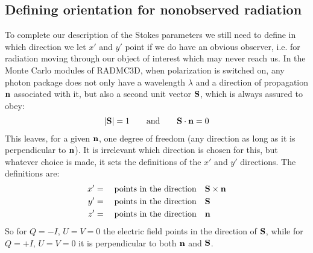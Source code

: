 \documentclass[letterpaper,10pt,english]{sphinxmanual}
\begin{document}
\subsection{Defining orientation for non\sphinxhyphen{}observed radiation}
\label{\detokenize{dustradtrans:defining-orientation-for-non-observed-radiation}}\label{\detokenize{dustradtrans:sec-orientation-vector-stokes}}
To complete our description of the Stokes parameters we still need to define in
which direction we let \(x'\) and \(y'\) point if we do  have an
obvious observer, i.e. for radiation moving through our object of interest which
may never reach us. In the Monte Carlo modules of RADMC\sphinxhyphen{}3D, when polarization is
switched on, any photon package does not only have a wavelength \(\lambda\)
and a direction of propagation \({\bf n}\) associated with it, but also a
second unit vector \({\bf S}\), which is always assured to obey:
\begin{equation*}
\begin{split}|{\bf S}| = 1 \qquad \hbox{and} \qquad {\bf S}\cdot{\bf n}=0\end{split}
\end{equation*}
This leaves, for a given \({\bf n}\), one degree of freedom (any direction
as long as it is perpendicular to \({\bf n}\)). It is irrelevant which
direction is chosen for this, but whatever choice is made, it sets the
definitions of the \(x'\) and \(y'\) directions. The definitions are:
\begin{equation*}
\begin{split}\begin{split}
x' &= \quad\hbox{points in the direction}\quad {\bf S}\times {\bf n}\\
y' &= \quad\hbox{points in the direction}\quad {\bf S}\\
z' &= \quad\hbox{points in the direction}\quad {\bf n}
\end{split}\end{split}
\end{equation*}
So for \(Q=-I\), \(U=V=0\) the electric field points in the direction of
\({\bf S}\), while for \(Q=+I\), \(U=V=0\) it is perpendicular to
both \({\bf n}\) and \({\bf S}\).
\end{document}
